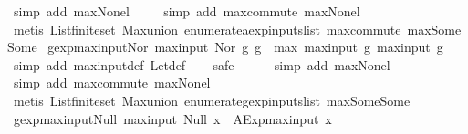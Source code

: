 \begin{isabellebody}
\ {\isacharparenleft}simp\ add{\isacharcolon}\ max{\isacharunderscore}None{\isacharunderscore}l{\isacharparenright}\isanewline
\ \ \ \isamarkupfalse%
\ {\isacharparenleft}simp\ add{\isacharcolon}\ max{\isachardot}commute\ max{\isacharunderscore}None{\isacharunderscore}l{\isacharparenright}\isanewline
\ \ \isamarkupfalse%
\ {\isacharparenleft}metis\ List{\isachardot}finite{\isacharunderscore}set\ Max{\isachardot}union\ enumerate{\isacharunderscore}aexp{\isacharunderscore}inputs{\isacharunderscore}list\ max{\isachardot}commute\ max{\isacharunderscore}Some{\isacharunderscore}Some{\isacharparenright}%
\endisatagproof
{\isafoldproof}%
%
\isadelimproof
\isanewline
%
\endisadelimproof
\isanewline
{}\isamarkupfalse%
\ gexp{\isacharunderscore}max{\isacharunderscore}input{\isacharunderscore}Nor{\isacharcolon}\ {\isachardoublequoteopen}max{\isacharunderscore}input\ {\isacharparenleft}Nor\ g{}\ g{}{\isacharparenright}\ {\isacharequal}\ max\ {\isacharparenleft}max{\isacharunderscore}input\ g{}{\isacharparenright}\ {\isacharparenleft}max{\isacharunderscore}input\ g{}{\isacharparenright}{\isachardoublequoteclose}\isanewline
%
\isadelimproof
\ \ %
\endisadelimproof
%
\isatagproof
{}\isamarkupfalse%
\ {\isacharparenleft}simp\ add{\isacharcolon}\ max{\isacharunderscore}input{\isacharunderscore}def\ Let{\isacharunderscore}def{\isacharparenright}\isanewline
\ \ \isamarkupfalse%
\ safe\isanewline
\ \ \ \ \isamarkupfalse%
\ {\isacharparenleft}simp\ add{\isacharcolon}\ max{\isacharunderscore}None{\isacharunderscore}l{\isacharparenright}\isanewline
\ \ \ \isamarkupfalse%
\ {\isacharparenleft}simp\ add{\isacharcolon}\ max{\isachardot}commute\ max{\isacharunderscore}None{\isacharunderscore}l{\isacharparenright}\isanewline
\ \ \isamarkupfalse%
\ {\isacharparenleft}metis\ List{\isachardot}finite{\isacharunderscore}set\ Max{\isachardot}union\ enumerate{\isacharunderscore}gexp{\isacharunderscore}inputs{\isacharunderscore}list\ max{\isacharunderscore}Some{\isacharunderscore}Some{\isacharparenright}%
\endisatagproof
{\isafoldproof}%
%
\isadelimproof
\isanewline
%
\endisadelimproof
\isanewline
{}\isamarkupfalse%
\ gexp{\isacharunderscore}max{\isacharunderscore}input{\isacharunderscore}Null{\isacharcolon}\ {\isachardoublequoteopen}max{\isacharunderscore}input\ {\isacharparenleft}Null\ x{\isacharparenright}\ {\isacharequal}\ AExp{\isachardot}max{\isacharunderscore}input\ x{\isachardoublequoteclose}\isanewline

\end{isabellebody}
